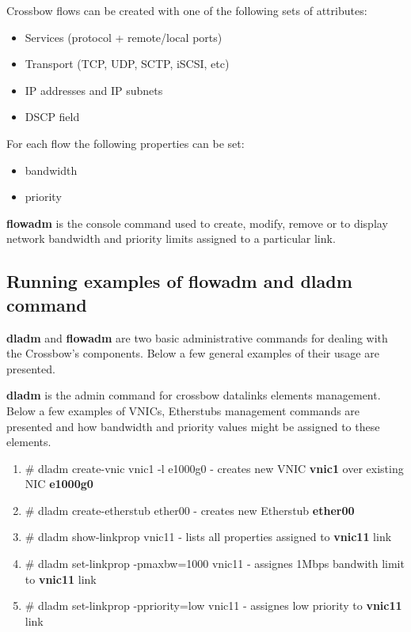 \documentclass[11pt]{book}
\begin{document}
                        \medskip

                        Crossbow flows can be created with one of the following sets of attributes:
                        \begin{itemize}
                        	\item Services (protocol + remote/local ports)
                        	\item Transport (TCP, UDP, SCTP, iSCSI, etc)
                        	\item IP addresses and IP subnets
                          \item DSCP field
                        \end{itemize}

                        For each flow the following properties can be set: 
                        \begin{itemize}
                        	\item{bandwidth}
                        	\item{priority}
                        \end{itemize}

                        \medskip

                        \textbf{flowadm} is the console command used to create, modify, remove or to display network bandwidth and priority limits assigned to a particular link. 


                \subsection{Running examples of flowadm and dladm command}

                        \textbf{dladm} and \textbf{flowadm} are two basic administrative commands for dealing with the Crossbow's components. Below a few general examples of their usage are presented.

                        \textbf{dladm} is the admin command for crossbow datalinks elements management. Below a few examples of VNICs, Etherstubs management commands are presented and how
                        bandwidth and priority values might be assigned to these elements.

                        \begin{enumerate}
                        	\item{\# dladm create-vnic vnic1 -l e1000g0 - creates new VNIC \textbf{vnic1} over existing NIC \textbf{e1000g0}}
        	                \item{\# dladm create-etherstub ether00 - creates new Etherstub \textbf{ether00}}
                        	\item{\# dladm show-linkprop vnic11 - lists all properties assigned to \textbf{vnic11} link}
                        	\item{\# dladm set-linkprop -pmaxbw=1000 vnic11 - assignes 1Mbps bandwith limit to \textbf{vnic11} link}
                        	\item{\# dladm set-linkprop -ppriority=low vnic11 - assignes low priority to \textbf{vnic11} link}
                        \end{enumerate}
\end{document}

